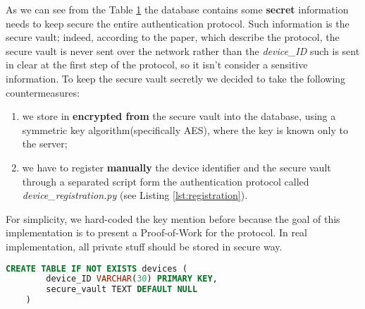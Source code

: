 \begin{figure}[h]
    \begin{minipage}{.48\textwidth}
        \label{tab:devices-table}
        \vspace{.5\baselineskip}
    \end{minipage}
\end{figure}
As we can see from the Table \ref{tab:devices-table} the database contains some \textbf{secret} information needs to keep secure the entire authentication protocol. Such information is the secure vault; indeed, according to the paper, which describe the protocol, the secure vault is never sent over the network rather than the \textit{device\_ID} such is sent in clear at the first step of the protocol, so it isn't consider a sensitive information.
To keep the secure vault secretly we decided to take the following countermeasures:
\begin{enumerate}
    \item we store in \textbf{encrypted from} the secure vault into the database, using a symmetric key algorithm(specifically AES), where the key is known only to the server;
    \item we have to register \textbf{manually} the device identifier and the secure vault through a separated script form the authentication protocol called \textit{device\_registration.py} (see Listing \ref{lst:registration}).
\end{enumerate}
For simplicity, we hard-coded the key mention before because the goal of this implementation is to present a Proof-of-Work for the protocol. In real implementation, all private stuff should be stored in secure way.

\begin{lstlisting}[language=SQL, basicstyle=\small, caption=SQLite table creation, label={lst:sql-table}]
    CREATE TABLE IF NOT EXISTS devices (
        device_ID VARCHAR(30) PRIMARY KEY,
        secure_vault TEXT DEFAULT NULL
    )
\end{lstlisting}

